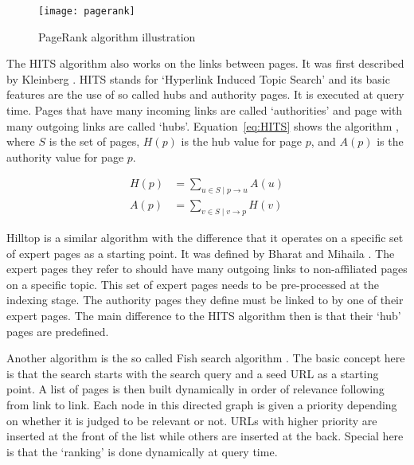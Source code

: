 \begin{figure}[!htbp] %
  \centering
  \texttt{[image: pagerank]}
\caption[PageRank algorithm]{PageRank algorithm illustration \autocite{Wikimedia2012}}
\label{fig:pagerank}
\end{figure}

The HITS algorithm also works on the links between pages. It was first described by Kleinberg \autocite*{Kleinberg1999, Kleinberg1999a}. HITS stands for `Hyperlink Induced Topic Search' and its basic features are the use of so called hubs and authority pages. It is executed at query time. Pages that have many incoming links are called `authorities' and page with many outgoing links are called `hubs'. Equation~\ref{eq:HITS} shows the algorithm \autocite[p.471]{Baeza-Yates2011}, where $S$ is the set of pages, $H(p)$ is the hub value for page $p$, and $A(p)$ is the authority value for page $p$.

\begin{equation}
  \begin{split}
  H(p) &= \sum_{u\in S \mid p\to u}A(u)\\
  A(p) &= \sum_{v\in S \mid v\to p}H(v)
  \end{split}
  \label{eq:HITS}
\end{equation}

Hilltop is a similar algorithm with the difference that it operates on a specific set of expert pages as a starting point. It was defined by Bharat and Mihaila \autocite*{Bharat2000}. The expert pages they refer to should have many outgoing links to non-affiliated pages on a specific topic. This set of expert pages needs to be pre-processed at the indexing stage. The authority pages they define must be linked to by one of their expert pages. The main difference to the HITS algorithm then is that their `hub' pages are predefined.

Another algorithm is the so called Fish search algorithm \autocite*{DeBra1994, DeBra1994a, DeBra1994b}. The basic concept here is that the search starts with the search query and a seed URL as a starting point. A list of pages is then built dynamically in order of relevance following from link to link. Each node in this directed graph is given a priority depending on whether it is judged to be relevant or not. URLs with higher priority are inserted at the front of the list while others are inserted at the back. Special here is that the `ranking' is done dynamically at query time.

